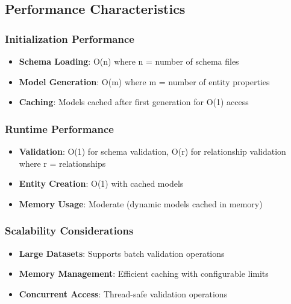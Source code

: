 \subsection{Performance Characteristics}
\label{sec:python-performance}

\subsubsection{Initialization Performance}
\label{sec:python-init-performance}

\begin{itemize}
    \item \textbf{Schema Loading}: O(n) where n = number of schema files
    \item \textbf{Model Generation}: O(m) where m = number of entity properties  
    \item \textbf{Caching}: Models cached after first generation for O(1) access
\end{itemize}

\subsubsection{Runtime Performance}
\label{sec:python-runtime-performance}

\begin{itemize}
    \item \textbf{Validation}: O(1) for schema validation, O(r) for relationship validation where r = relationships
    \item \textbf{Entity Creation}: O(1) with cached models
    \item \textbf{Memory Usage}: Moderate (dynamic models cached in memory)
\end{itemize}

\subsubsection{Scalability Considerations}
\label{sec:python-scalability}

\begin{itemize}
    \item \textbf{Large Datasets}: Supports batch validation operations
    \item \textbf{Memory Management}: Efficient caching with configurable limits
    \item \textbf{Concurrent Access}: Thread-safe validation operations
\end{itemize}

